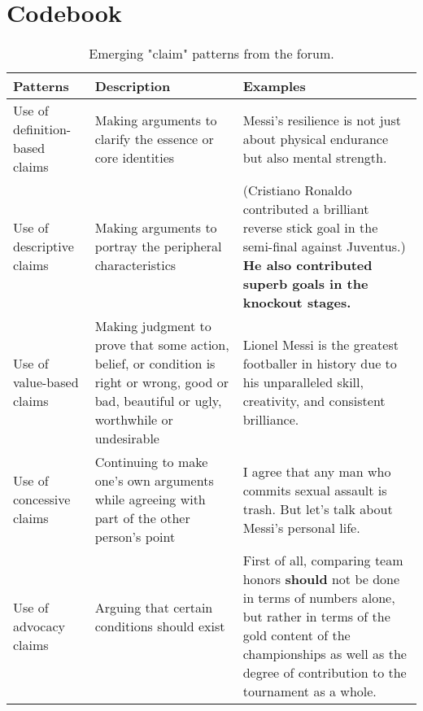 \clearpage
\section{Codebook}
\label{B}

\begin{table*}[h!]
  \caption{Emerging "claim" patterns from the forum.}
  \begin{tabular}{>{\raggedright\arraybackslash}p{2.5cm}>{\raggedright\arraybackslash}p{4cm}>{\raggedright\arraybackslash}p{9.5cm}}
    \toprule
    \textbf{Patterns} & \textbf{Description} & \textbf{Examples}\\
    \midrule
    Use of definition-based claims & Making arguments to clarify the essence or core identities & 
    Messi's resilience is not just about physical endurance but also mental strength. \\
    \hline
    Use of descriptive claims & Making arguments to portray the peripheral characteristics & (Cristiano Ronaldo contributed a brilliant reverse stick goal in the semi-final against Juventus.) \textbf{He also contributed superb goals in the knockout stages.}\\
    \hline
    Use of value-based claims & Making judgment to prove that some action, belief, or condition is right or wrong, good or bad, beautiful or ugly, worthwhile or undesirable ~\cite{rottenberg_structure_2014} & Lionel Messi is the greatest footballer in history due to his unparalleled skill, creativity, and consistent brilliance. \\
    \hline
    Use of concessive claims & Continuing to make one's own arguments while agreeing with part of the other person's point ~\cite{tanskanen_concessive_2008} & I agree that any man who commits sexual assault is trash. But let's talk about Messi's personal life. \\
    \hline
    Use of advocacy claims & Arguing that certain conditions should exist ~\cite{rottenberg_structure_2014} & First of all, comparing team honors \textbf{should} not be done in terms of numbers alone, but rather in terms of the gold content of the championships as well as the degree of contribution to the tournament as a whole. \\
    \bottomrule
  \end{tabular}
\end{table*}

